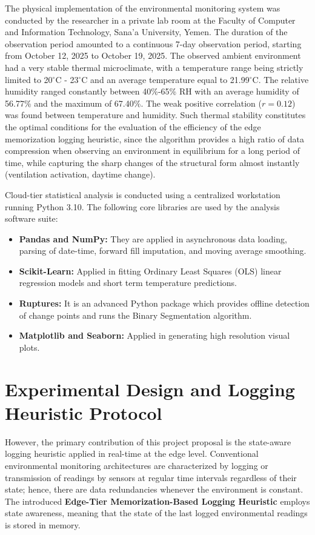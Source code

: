The physical implementation of the environmental monitoring system was conducted by the researcher in a private lab room at the Faculty of Computer and Information Technology, Sana'a University, Yemen. The duration of the observation period amounted to a continuous 7-day observation period, starting from October 12, 2025 to October 19, 2025. The observed ambient environment had a very stable thermal microclimate, with a temperature range being strictly limited to 20$^\circ$C - 23$^\circ$C and an average temperature equal to 21.99$^\circ$C. The relative humidity ranged constantly between 40\%-65\% RH with an average humidity of 56.77\% and the maximum of 67.40\%. The weak positive correlation ($r = 0.12$) was found between temperature and humidity. Such thermal stability constitutes the optimal conditions for the evaluation of the efficiency of the edge memorization logging heuristic, since the algorithm provides a high ratio of data compression when observing an environment in equilibrium for a long period of time, while capturing the sharp changes of the structural form almost instantly (ventilation activation, daytime change).

Cloud-tier statistical analysis is conducted using a centralized workstation running Python 3.10. The following core libraries are used by the analysis software suite:
\begin{itemize}
 \item \textbf{Pandas and NumPy:} They are applied in asynchronous data loading, parsing of date-time, forward fill imputation, and moving average smoothing.
    \item \textbf{Scikit-Learn:} Applied in fitting Ordinary Least Squares (OLS) linear regression models and short term temperature predictions.
    \item \textbf{Ruptures:} It is an advanced Python package which provides offline detection of change points and runs the Binary Segmentation algorithm.
    \item \textbf{Matplotlib and Seaborn:} Applied in generating high resolution visual plots.
\end{itemize}

\section{Experimental Design and Logging Heuristic Protocol}
\label{sec:heuristic}
However, the primary contribution of this project proposal is the state-aware logging heuristic applied in real-time at the edge level. Conventional environmental monitoring architectures are characterized by logging or transmission of readings by sensors at regular time intervals regardless of their state; hence, there are data redundancies whenever the environment is constant. The introduced \textbf{Edge-Tier Memorization-Based Logging Heuristic} employs state awareness, meaning that the state of the last logged environmental readings is stored in memory.


